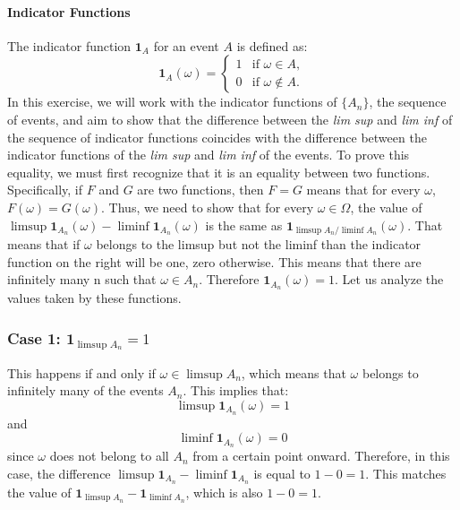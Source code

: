     \paragraph{Indicator Functions}
    The indicator function $\mathbf{1}_A$ for an event $A$ is defined as:
    \[
    \mathbf{1}_A(\omega) = \begin{cases} 
    1 & \text{if } \omega \in A, \\
    0 & \text{if } \omega \notin A.
    \end{cases}
    \]
    In this exercise, we will work with the indicator functions of $\{A_n\}$, the sequence of events, and aim to show that the difference between the \textit{lim sup} and \textit{lim inf} of the sequence of indicator functions coincides with the difference between the indicator functions of the \textit{lim sup} and \textit{lim inf} of the events. To prove this equality, we must first recognize that it is an equality between two functions. Specifically, if $F$ and $G$ are two functions, then $F = G$ means that for every $\omega$, $F(\omega) = G(\omega)$. \newline
    Thus, we need to show that for every $\omega \in \Omega$, the value of $\limsup \mathbf{1}_{A_n}(\omega) - \liminf \mathbf{1}_{A_n}(\omega)$ is the same as $\mathbf{1}_{\limsup A_n / \liminf A_n}(\omega)$. That means that if $\omega$ belongs to the limsup but not the liminf than the indicator function on the right will be one, zero otherwise. This means that there are infinitely many n such that $\omega \in A_n$. Therefore $\mathbf{1}_{A_n}(\omega) = 1$. 
    \newline
    Let us analyze the values taken by these functions.
    
    \subsubsection{Case 1: $\mathbf{1}_{\limsup A_n} = 1$}
    This happens if and only if $\omega \in \limsup A_n$, which means that $\omega$ belongs to infinitely many of the events $A_n$. This implies that:
    \[
    \limsup \mathbf{1}_{A_n}(\omega) = 1
    \]
    and
    \[
    \liminf \mathbf{1}_{A_n}(\omega) = 0
    \]
    since $\omega$ does not belong to all $A_n$ from a certain point onward. \newline
    Therefore, in this case, the difference $\limsup \mathbf{1}_{A_n} - \liminf \mathbf{1}_{A_n}$ is equal to $1 - 0 = 1$. This matches the value of $\mathbf{1}_{\limsup A_n} - \mathbf{1}_{\liminf A_n}$, which is also $1 - 0 = 1$.
    
